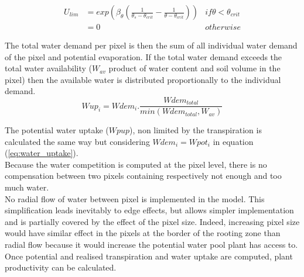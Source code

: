 \documentclass[a4paper,twoside, justified,marginals=raggedright, nobib]{tufte-handout}
\begin{document}
\begin{align}
U_{lim} &= exp\left(\beta_{\theta} \left( \frac{1}{\theta_{s} - \theta_{crit}} - \frac{1}{\theta - \theta_{crit}}\right)\right) & if \theta < \theta_{crit}\\
 &= 0 & otherwise
\end{align}

The total water demand per pixel is then the sum of all individual water demand of the pixel and potential evaporation. If the total water demand exceeds the total water availability ($W_{av}$ product of water content and soil volume in the pixel) then the available water is distributed proportionally to the individual demand.\\
\begin{equation}\label{eq:water_uptake}
Wup_{i} = Wdem_{i} . \frac{Wdem_{total}}{min(Wdem_{total}, W_{av})}
\end{equation}


\indent The potential water uptake ($Wpup$), non limited by the transpiration is calculated the same way but considering $Wdem_{i} = Wpot_{i}$ in equation (\ref{eq:water_uptake}).\\
\indent Because the water competition is computed at the pixel level, there is no compensation between two pixels containing respectively not enough and too much water.\\
\indent No radial flow of water between pixel is implemented in the model. This simplification leads inevitably to edge effects, but allows simpler implementation and is partially covered by the effect of the pixel size. Indeed, increasing pixel size would have similar effect in the pixels at the border of the rooting zone than radial flow because it would increase the potential water pool plant has access to.\\

\indent Once potential and realised transpiration and water uptake are computed, 
plant productivity can be calculated.
\end{document}

